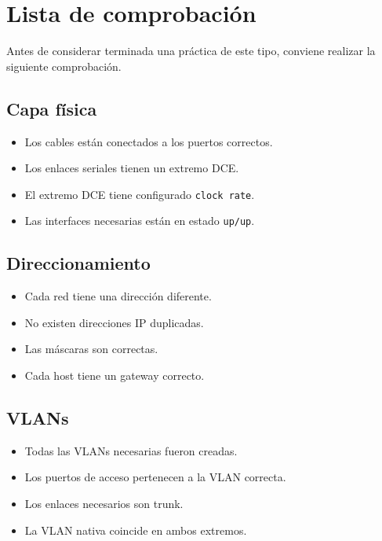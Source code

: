 \documentclass[12pt]{article}
\begin{document}
\section{Lista de comprobación}

Antes de considerar terminada una práctica de este tipo, conviene realizar
la siguiente comprobación.

\subsection*{Capa física}

\begin{itemize}
    \item[$\square$] Los cables están conectados a los puertos correctos.
    \item[$\square$] Los enlaces seriales tienen un extremo DCE.
    \item[$\square$] El extremo DCE tiene configurado \texttt{clock rate}.
    \item[$\square$] Las interfaces necesarias están en estado \texttt{up/up}.
\end{itemize}

\subsection*{Direccionamiento}

\begin{itemize}
    \item[$\square$] Cada red tiene una dirección diferente.
    \item[$\square$] No existen direcciones IP duplicadas.
    \item[$\square$] Las máscaras son correctas.
    \item[$\square$] Cada host tiene un gateway correcto.
\end{itemize}

\subsection*{VLANs}

\begin{itemize}
    \item[$\square$] Todas las VLANs necesarias fueron creadas.
    \item[$\square$] Los puertos de acceso pertenecen a la VLAN correcta.
    \item[$\square$] Los enlaces necesarios son trunk.
    \item[$\square$] La VLAN nativa coincide en ambos extremos.
\end{itemize}
\end{document}
